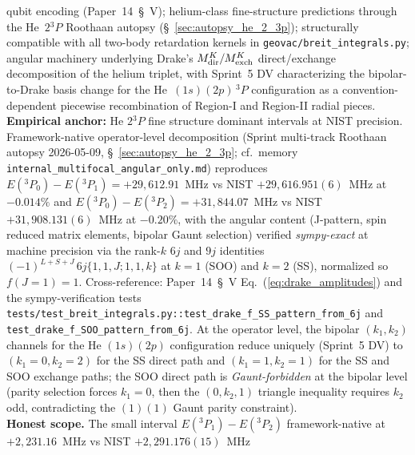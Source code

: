 qubit encoding (Paper~14~\S~V); helium-class fine-structure
predictions through the He~$2{}^3\!P$ Roothaan autopsy
(\S~\ref{sec:autopsy_he_2_3p}); structurally compatible with all
two-body retardation kernels in
\texttt{geovac/breit\_integrals.py}; angular machinery underlying
Drake's $M^K_{\rm dir} / M^K_{\rm exch}$ direct/exchange
decomposition of the helium triplet, with Sprint~5 DV
characterizing the bipolar-to-Drake basis change for the
He~$(1s)(2p)\,{}^3\!P$ configuration as a
convention-dependent piecewise recombination of Region-I and
Region-II radial pieces.\\
\textbf{Empirical anchor:} He $2{}^3\!P$ fine structure dominant
intervals at NIST precision.  Framework-native operator-level
decomposition (Sprint multi-track Roothaan autopsy 2026-05-09,
\S~\ref{sec:autopsy_he_2_3p}; cf.\ memory
\texttt{internal\_multifocal\_angular\_only.md}) reproduces
$E({}^3\!P_0) - E({}^3\!P_1) = +29{,}612.91$~MHz vs NIST
$+29{,}616.951(6)$~MHz at $-0.014\%$ and
$E({}^3\!P_0) - E({}^3\!P_2) = +31{,}844.07$~MHz vs NIST
$+31{,}908.131(6)$~MHz at $-0.20\%$, with the angular content (J-pattern,
spin reduced matrix elements, bipolar Gaunt selection) verified
\emph{sympy-exact} at machine precision via the rank-$k$ $6j$ and
$9j$ identities $(-1)^{L+S+J}\,6j\{1,1,J;1,1,k\}$ at $k = 1$ (SOO)
and $k = 2$ (SS), normalized so $f(J{=}1) = 1$.  Cross-reference:
Paper~14~\S~V Eq.~(\ref{eq:drake_amplitudes}) and the
sympy-verification tests
\texttt{tests/test\_breit\_integrals.py::test\_drake\_f\_SS\_pattern\_from\_6j}
and \texttt{test\_drake\_f\_SOO\_pattern\_from\_6j}.  At the
operator level, the bipolar $(k_1, k_2)$ channels for the He
$(1s)(2p)$ configuration reduce uniquely (Sprint~5 DV) to
$(k_1{=}0, k_2{=}2)$ for the SS direct path and $(k_1{=}1, k_2{=}1)$
for the SS and SOO exchange paths; the SOO direct path is
\emph{Gaunt-forbidden} at the bipolar level (parity selection forces
$k_1 = 0$, then the $(0, k_2, 1)$ triangle inequality requires
$k_2$ odd, contradicting the $(1)(1)$ Gaunt parity constraint).\\
\textbf{Honest scope.}  The small interval $E({}^3\!P_1) - E({}^3\!P_2)$
framework-native at $+2{,}231.16$~MHz vs NIST $+2{,}291.176(15)$~MHz
